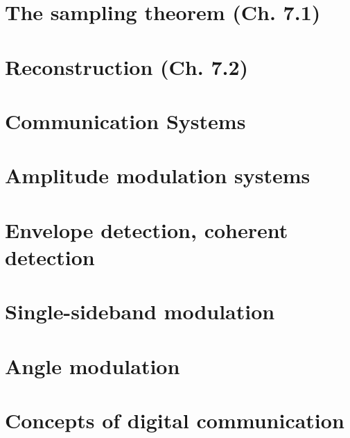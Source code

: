 \documentclass{article}
\begin{document}
\section{The sampling theorem (Ch. 7.1)}
\newpage

\section{Reconstruction (Ch. 7.2)}
\newpage

\section*{Communication Systems}
\section{Amplitude modulation systems}
\newpage

\section{Envelope detection, coherent detection}
\newpage

\section{Single-sideband modulation}
\newpage

\section{Angle modulation}
\newpage

\section{Concepts of digital communication}
\end{document}
